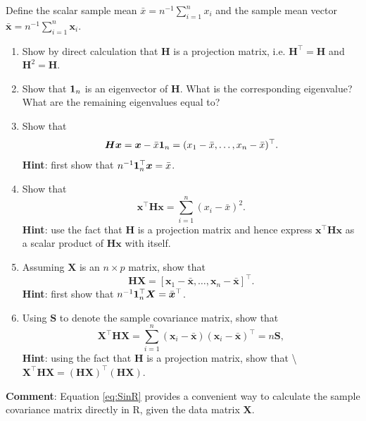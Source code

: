 \documentclass[]{book}
\theoremstyle{definition}
\theoremstyle{definition}
\theoremstyle{definition}
\theoremstyle{remark}
\begin{document}
\begin{enumerate}
  Define the scalar sample mean \(\bar{x}=n^{-1}\sum_{i=1}^n x_i\) and the sample mean vector \(\bar{\boldsymbol x}=n^{-1} \sum_{i=1}^n \boldsymbol x_i\).

  \begin{enumerate}
  \def\labelenumii{\roman{enumii}.}
  \item
    Show by direct calculation that \(\boldsymbol H\) is a projection matrix, i.e. \(\boldsymbol H^\top = \boldsymbol H\) and \(\boldsymbol H^2 =\boldsymbol H\).
  \item
    Show that \({\bf 1}_n\) is an eigenvector of \(\boldsymbol H\). What is the corresponding eigenvalue? What are the remaining eigenvalues equal to?
  \item
    Show that
    \[
      \boldsymbol H\boldsymbol x= \boldsymbol x- \bar{x}{\bf 1}_n = (  x_1 - \bar{x}, \ldots , x_n -\bar{x})^\top.
      \]
    \textbf{Hint}: first show that \(n^{-1}{\bf 1}_n^\top \boldsymbol x=\bar{x}\).
  \item
    Show that
    \[
      \boldsymbol x^\top \boldsymbol H\boldsymbol x= \sum_{i=1}^n (x_i-\bar{x})^2.
      \]
    \textbf{Hint}: use the fact that \(\boldsymbol H\) is a projection matrix and hence express \(\boldsymbol x^\top \boldsymbol H\boldsymbol x\) as a scalar product of \(\boldsymbol H\boldsymbol x\) with itself.
  \item
    Assuming \(\boldsymbol X\) is an \(n \times p\) matrix, show that
    \[
      \boldsymbol H\boldsymbol X=[\boldsymbol x_1 - \bar{\boldsymbol x}, \ldots , \boldsymbol x_n -\bar{\boldsymbol x}]^\top.
      \]
    \textbf{Hint}: first show that \(n^{-1} {\bf 1}_n^\top \boldsymbol X=\bar{\boldsymbol x}^\top\).
  \item
    Using \(\boldsymbol S\) to denote the sample covariance matrix, show that
    \begin{equation}
      \boldsymbol X^\top \boldsymbol H\boldsymbol X= \sum_{i=1}^n (\boldsymbol x_i -\bar{\boldsymbol x})(\boldsymbol x_i -\bar{\boldsymbol x})^\top = n\boldsymbol S,
       \label{eq:SinR}
      \end{equation}
    \textbf{Hint}: using the fact that \(\boldsymbol H\) is a projection matrix,
    show that \textbackslash{}
    \(\boldsymbol X^\top \boldsymbol H\boldsymbol X=(\boldsymbol H\boldsymbol X)^\top (\boldsymbol H\boldsymbol X)\).
  \end{enumerate}

  \textbf{Comment}: Equation \eqref{eq:SinR} provides a convenient way to calculate the sample covariance matrix directly in R, given the data matrix \(\boldsymbol X\).
\end{enumerate}
\end{document}
